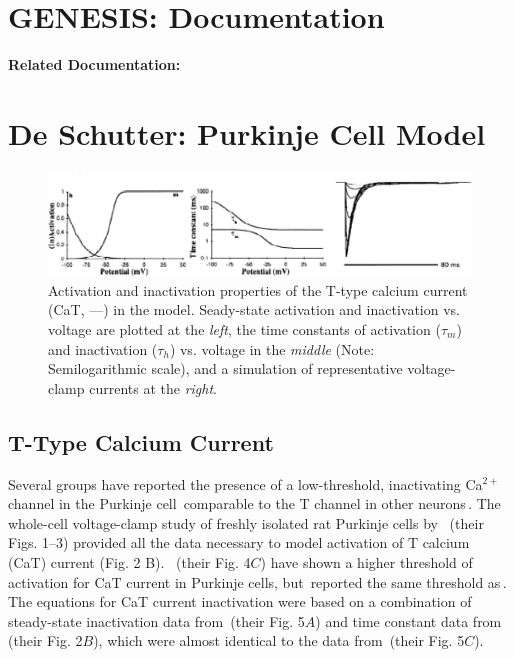\documentclass[12pt]{article}
\begin{document}
\section*{GENESIS: Documentation}

{\bf Related Documentation:}

\section*{De Schutter: Purkinje Cell Model}

\begin{figure}[h]
\centering
   \includegraphics[scale=0.75]{figures/DS1.2B.eps}
   \caption{Activation and inactivation properties of the T-type calcium current (CaT, ---) in the model. Seady-state activation and inactivation vs. voltage are plotted at the {\em left}, the time constants of activation ($\tau_m$) and inactivation ($\tau_h$) vs. voltage in the {\em middle} (Note: Semilogarithmic scale), and a simulation of representative voltage-clamp currents at the {\em right}.}
   \label{fig:DS1.2B}
\end{figure}

\subsection*{T-Type Calcium Current}

Several groups have reported the presence of a low-threshold, inactivating Ca$^{2+}$ channel in the Purkinje
cell\,\cite{Gruol:1990vn, Hirano:1989uq, Kaneda:1990ys} comparable to the T channel in other neurons\,\cite{Fox:1987zr}. The whole-cell voltage-clamp study of freshly isolated rat Purkinje cells by \,\cite{Kaneda:1990ys} (their Figs. 1--3) provided all the data necessary to model activation of T calcium (CaT) current (Fig. 2 B). \,\cite{Hirano:1989uq} (their Fig. 4$C$) have shown a higher threshold of activation for CaT current in Purkinje cells, but\,\cite{Gruol:1990vn} reported the same threshold as\,\cite{Kaneda:1990ys}. The equations for CaT current inactivation were based on a combination of steady-state inactivation data from\,\cite{Hirano:1989uq} (their Fig. 5$A$) and time constant data from\,\cite{Kaneda:1990ys} (their Fig. 2$B$), which were almost identical to the data from\,\cite{Hirano:1989uq} (their Fig. 5$C$).



\end{document}
